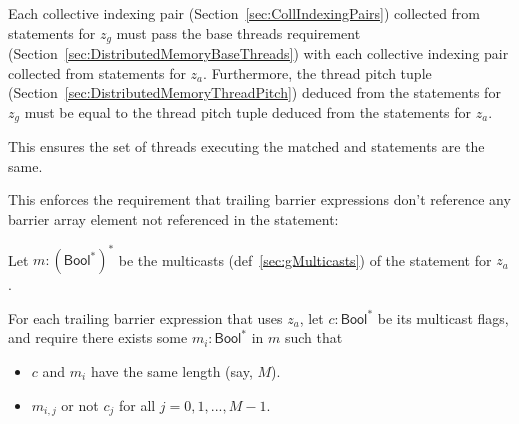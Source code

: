  Each collective indexing pair (Section~\ref{sec:CollIndexingPairs}) collected from  statements for $z_g$ must pass the base threads requirement (Section~\ref{sec:DistributedMemoryBaseThreads}) with each collective indexing pair collected from  statements for $z_a$.
Furthermore, the thread pitch tuple (Section~\ref{sec:DistributedMemoryThreadPitch}) deduced from the  statements for $z_g$ must be equal to the thread pitch tuple deduced from the  statements for $z_a$.

This ensures the set of threads executing the matched  and  statements are the same.

 This enforces the requirement that trailing barrier expressions don't reference any barrier array element not referenced in the  statement:

Let $m: (\mathsf{Bool}^*)^*$ be the multicasts (def~\ref{sec:gMulticasts}) of the  statement for $z_a$.

For each trailing barrier expression that uses $z_a$, let $c: \mathsf{Bool}^*$ be its multicast flags, and require there exists some $m_i: \mathsf{Bool}^*$ in $m$ such that
\begin{itemize}
  \item $c$ and $m_i$ have the same length (say, $M$).
  \item $m_{i,j}$ or not $c_j$ for all $j = 0, 1, ..., M-1$.
\end{itemize}

